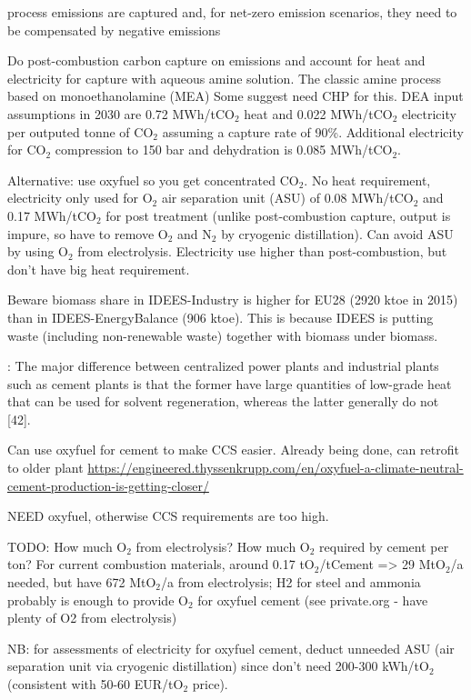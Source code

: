 process emissions are captured and, for net-zero emission scenarios,
they need to be compensated by negative emissions

Do post-combustion carbon capture on emissions and account for heat and
electricity for capture with aqueous amine solution. The classic amine process
based on monoethanolamine (MEA) Some suggest need CHP for this. DEA input
assumptions in 2030 are 0.72 MWh/tCO$_2$ heat and 0.022 MWh/tCO$_2$ electricity
per outputed tonne of CO$_2$ assuming a capture rate of 90\%. Additional
electricity for CO$_2$ compression to 150 bar and dehydration is 0.085
MWh/tCO$_2$.

Alternative: use oxyfuel so you get concentrated CO$_2$. No heat requirement,
electricity only used for O$_2$ air separation unit (ASU) of 0.08 MWh/tCO$_2$
and 0.17 MWh/tCO$_2$ for post treatment (unlike post-combustion capture, output
is impure, so have to remove O$_2$ and N$_2$ by cryogenic distillation). Can
avoid ASU by using O$_2$ from electrolysis. Electricity use higher than
post-combustion, but don't have big heat requirement.

Beware biomass share in IDEES-Industry is higher for EU28 (2920 ktoe in 2015)
than in IDEES-EnergyBalance (906 ktoe). This is because IDEES is putting waste
(including non-renewable waste) together with biomass under biomass.

: The major difference between centralized power plants and
industrial plants such as cement plants is that the former have large quantities
of low-grade heat that can be used for solvent regeneration, whereas the latter
generally do not [42].


Can use oxyfuel for cement to make CCS easier. Already being done, can retrofit
to older plant
\url{https://engineered.thyssenkrupp.com/en/oxyfuel-a-climate-neutral-cement-production-is-getting-closer/}

NEED oxyfuel, otherwise CCS requirements are too high.

TODO: How much O$_2$ from electrolysis? How much O$_2$ required by cement per
ton? For current combustion materials, around 0.17 tO$_2$/tCement => 29
MtO$_2$/a needed, but have 672 MtO$_2$/a from electrolysis; H2 for steel and
ammonia probably is enough to provide O$_2$ for oxyfuel cement (see private.org
- have plenty of O2 from electrolysis)

NB: for assessments of electricity for oxyfuel cement, deduct unneeded ASU (air
separation unit via cryogenic distillation) since don't need 200-300 kWh/tO$_2$
(consistent with 50-60 EUR/tO$_2$ price).

